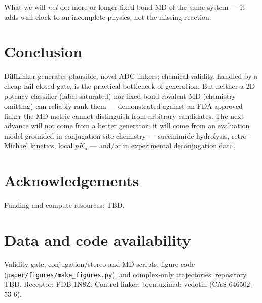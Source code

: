 \documentclass[10pt,twocolumn]{article}
\begin{document}
\noindent What we will \emph{not} do: more or longer fixed-bond MD of the same system --- it adds
wall-clock to an incomplete physics, not the missing reaction.

\section{Conclusion}
DiffLinker generates plausible, novel ADC linkers; chemical validity, handled by a cheap fail-closed
gate, is the practical bottleneck of generation. But neither a 2D potency classifier (label-saturated)
nor fixed-bond covalent MD (chemistry-omitting) can reliably rank them --- demonstrated against an
FDA-approved linker the MD metric cannot distinguish from arbitrary candidates. The next advance will not
come from a better generator; it will come from an evaluation model grounded in conjugation-site
chemistry --- succinimide hydrolysis, retro-Michael kinetics, local $pK_\mathrm{a}$ --- and/or in
experimental deconjugation data.

\section*{Acknowledgements}
Funding and compute resources: TBD.

\section*{Data and code availability}
Validity gate, conjugation/stereo and MD scripts, figure code
(\texttt{paper/figures/make\_figures.py}), and complex-only trajectories: repository TBD. Receptor: PDB
1N8Z. Control linker: brentuximab vedotin (CAS 646502-53-6).

{\small


}
\end{document}
